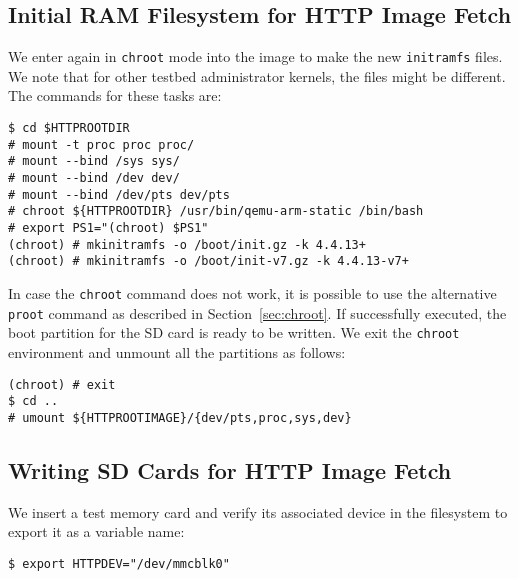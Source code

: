 \subsection{Initial RAM Filesystem for HTTP Image Fetch}
We enter again in \texttt{chroot} mode into the image to make the new
\texttt{initramfs} files. We note that for other testbed administrator
kernels, the files might be different. The commands for these tasks are:

\begin{lstlisting}[]
$ cd $HTTPROOTDIR
# mount -t proc proc proc/
# mount --bind /sys sys/
# mount --bind /dev dev/
# mount --bind /dev/pts dev/pts
# chroot ${HTTPROOTDIR} /usr/bin/qemu-arm-static /bin/bash
# export PS1="(chroot) $PS1"
(chroot) # mkinitramfs -o /boot/init.gz -k 4.4.13+
(chroot) # mkinitramfs -o /boot/init-v7.gz -k 4.4.13-v7+
\end{lstlisting}
\FloatBarrier
\vspace{-5mm}

In case the \texttt{chroot} command does not work, it is possible to use
the alternative \texttt{proot} command as described in
Section~\ref{sec:chroot}. If successfully executed, the boot partition for
the SD card is ready to be written. We exit the \texttt{chroot} environment
and unmount all the partitions as follows:

\begin{lstlisting}[]
(chroot) # exit
$ cd ..
# umount ${HTTPROOTIMAGE}/{dev/pts,proc,sys,dev}
\end{lstlisting}
\FloatBarrier
\vspace{-5mm}

\subsection{Writing SD Cards for HTTP Image Fetch}


We insert a test memory card and verify its associated device in the
filesystem to export it as a variable name:

\begin{lstlisting}[]
$ export HTTPDEV="/dev/mmcblk0"
\end{lstlisting}
\FloatBarrier
\vspace{-5mm}

